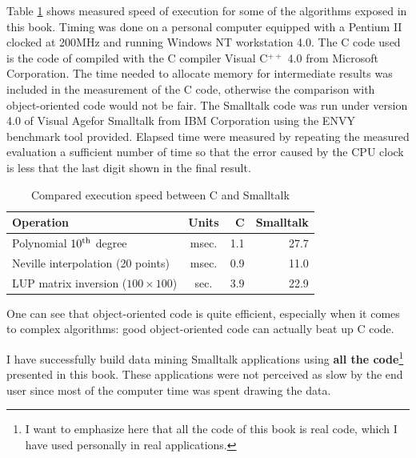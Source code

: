 \documentclass[twoside]{book}
\begin{document}
Table \ref{tb:speed} shows measured speed of execution for some of
the algorithms exposed in this book. Timing was done on a personal
computer equipped with a Pentium II clocked at 200MHz and running
Windows NT workstation 4.0. The C code used is the code of
\cite{Press} compiled with the C compiler Visual C$^{++}$ 4.0 from
Microsoft Corporation. The time needed to allocate memory for
intermediate results was included in the measurement of the C
code, otherwise the comparison with object-oriented code would not
be fair. The Smalltalk code was run under version 4.0 of Visual
Age\tm for Smalltalk from IBM Corporation using the ENVY benchmark
tool provided.
Elapsed time were measured
by repeating the measured evaluation a sufficient number of time
so that the error caused by the CPU clock is less that the last
digit shown in the final result.
\begin{table}[h]
\caption{Compared execution speed between C and Smalltalk}
\label{tb:speed} \vspace{1 ex}
\begin{tabular}{|l | c r r |} \hline
  \hfil {\bf Operation} & {\bf Units} & {\bf C}\hfil & {\bf Smalltalk}\hfil \\ \hline
  Polynomial $10^{\mathop{\rm th}}$ degree & msec. & 1.1 & 27.7 \\
  Neville interpolation (20 points) & msec. & 0.9 & 11.0 \\
  LUP matrix inversion ($100\times 100$)& sec. & 3.9 & 22.9 \\ \hline
\end{tabular}
\end{table}

One can see that object-oriented code is quite efficient,
especially when it comes to complex algorithms: good
object-oriented code can actually beat up C code.


I have successfully build data mining Smalltalk
applications using {\bf all the code}\footnote{I want to emphasize
here that all the code of this book is real code, which I have
used personally in real applications.} presented in this book.
These applications were not perceived as slow by the end user
since most of the computer time was spent drawing the data.
\end{document}

